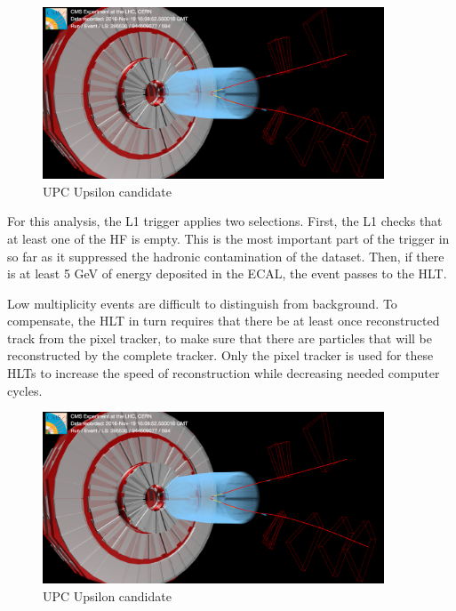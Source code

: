\begin{figure}[h!]
\begin{centering}
\includegraphics[width=4in]{Chapter3/importfigs/upcJpsi_run285530_lumi594_event944509077_v0.png}
\par\end{centering}
\caption{UPC Upsilon candidate \label{fig:eventdisplayUPCUps}}
\end{figure}

For this analysis, the L1 trigger applies two selections. First, the L1 checks that at least one of the HF is empty. This is the most important part of the trigger in so far as it suppressed the hadronic contamination of the dataset. Then, if there is at least 5 GeV of energy deposited in the ECAL, the event passes to the HLT. 

Low multiplicity events are difficult to distinguish from background. To compensate, the HLT in turn requires that there be at least once reconstructed track from the pixel tracker, to make sure that there are particles that will be reconstructed by the complete tracker. Only the pixel tracker is used for these HLTs to increase the speed of reconstruction while decreasing needed computer cycles. 

\begin{figure}[h!]
\begin{centering}
\includegraphics[width=4in]{Chapter3/importfigs/upcJpsi_run285530_lumi594_event944509077_v0.png}
\par\end{centering}
\caption{UPC Upsilon candidate \label{fig:eventdisplayUPCUps}}
\end{figure}


